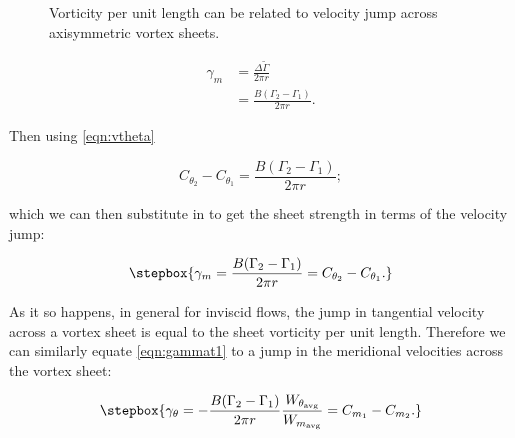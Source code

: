 \begin{figure}[h!]
    \centering
    
    \caption[Relationship between circulation and velocity.]{Vorticity per unit length can be related to velocity jump across axisymmetric vortex sheets.}
    \label{fig:velocityjump}
\end{figure}


\begin{equation}
    \begin{aligned}
        \gamma_m &= \frac{\Delta \widetilde{\Gamma}}{2 \pi r} \\
                 &= \frac{B(\Gamma_2-\Gamma_1)}{2 \pi r}.
    \end{aligned}
\end{equation}

\noindent Then using \cref{eqn:vtheta}


\begin{equation}
    \label{eqn:gamma2pre}
        C_{\theta_2} - C_{\theta_1} = \frac{B(\Gamma_2 - \Gamma_1)}{2 \pi r} ;
\end{equation}

\noindent which we can then substitute in to get the sheet strength in terms of the velocity jump:

\begin{equation}
    \label{eqn:gammam2}
    \stepbox{
    \gamma_m  = \frac{B(\Gamma_2-\Gamma_1)}{2 \pi r} = C_{\theta_2} - C_{\theta_1}.
}
\end{equation}

As it so happens, in general for inviscid flows, the jump in tangential velocity across a vortex sheet is equal to the sheet vorticity per unit length.
%
Therefore we can similarly equate \cref{eqn:gammat1} to a jump in the meridional velocities across the vortex sheet:

\begin{equation}
    \label{eqn:gammat2}
    \stepbox{
    \gamma_\theta  = -\frac{B(\Gamma_2 - \Gamma_1)}{2 \pi r} \frac{W_{\theta_\text{avg}}}{W_{m_\text{avg}}} = C_{m_1} - C_{m_2}.
}
\end{equation}

